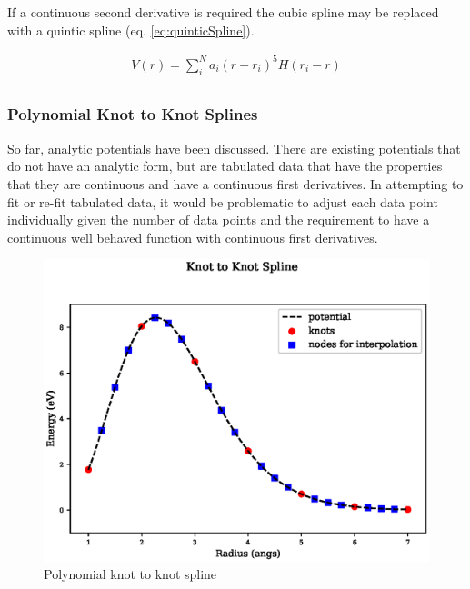 If a continuous second derivative is required the cubic spline may be replaced with a quintic spline (eq. \ref{eq:quinticSpline}).

\begin{equation}
\begin{split}
V(r) = \sum_i^N a_i (r - r_i)^5 H(r_i - r) \\
\end{split}
\label{eq:quinticSpline}
\end{equation}


\FloatBarrier
\subsubsection{Polynomial Knot to Knot Splines}

So far, analytic potentials have been discussed.  There are existing potentials that do not have an analytic form, but are tabulated data that have the properties that they are continuous and have a continuous first derivatives.  In attempting to fit or re-fit tabulated data, it would be problematic to adjust each data point individually given the number of data points and the requirement to have a continuous well behaved function with continuous first derivatives.

\begin{figure}[h]
  \begin{center}
    \includegraphics[scale=0.70]{chapters/interatomic_potential_fitting/plots_spline/spline.eps}
    \caption{Polynomial knot to knot spline}
    \label{fig:polynomialknots}
  \end{center}
\end{figure}

